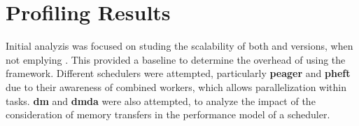 \documentclass[main.tex]{subfiles}
\begin{document}
\chapter{Profiling Results} \label{chapter:results}


Initial analyzis was focused on studing the scalability of both \cpu and \cuda versions, when not emplying \starpu. This provided a baseline to determine the overhead of using the framework. Different schedulers were attempted, particularly \textbf{peager} and \textbf{pheft} due to their awareness of combined workers, which allows \openmp parallelization within \cpu tasks. \textbf{dm} and \textbf{dmda} were also attempted, to analyze the impact of the consideration of memory transfers in the performance model of a scheduler.




%


\end{document}
